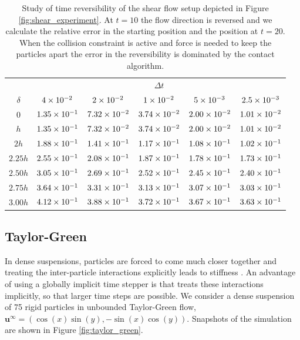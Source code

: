 \documentclass[preprint, 10pt]{elsarticle}
\begin{document}
\begin{table}[!h]
\begin{center}
\begin{tabular}{c| c c c c c}
$ $ & & & $\Delta t$ & &\\
$\delta$ & $4\times 10^{-2}$ &$ 2\times 10^{-2}$ & $1\times 10^{-2}$ & $5\times 10^{-3}$ & $2.5\times 10^{-3}$\\
\hline
0 & $1.35\times 10^{-1}$ & $7.32\times 10^{-2}$ & $3.74\times 10^{-2}$ & $2.00\times 10^{-2}$ & $1.01\times 10^{-2}$\\
$h$ & $1.35\times 10^{-1}$ & $7.32\times 10^{-2}$ & $3.74\times 10^{-2}$ & $2.00\times 10^{-2}$ & $1.01\times 10^{-2}$\\
$2h$ & $1.88\times 10^{-1}$ & $1.41\times 10^{-1}$ & $1.17\times 10^{-1}$ & $1.08\times 10^{-1}$ &
$1.02\times 10^{-1}$\\
$2.25h$ & $2.55\times 10^{-1}$ & $2.08\times 10^{-1}$ & $1.87\times 10^{-1}$ & $1.78\times 10^{-1}$ &
$1.73\times 10^{-1}$\\
$2.50h$ & $3.05\times 10^{-1}$ & $2.69\times 10^{-1}$ & $2.52\times 10^{-1}$ & $2.45\times 10^{-1}$ &
$2.40\times 10^{-1}$\\
$2.75h$ & $3.64\times 10^{-1}$ & $3.31\times 10^{-1}$ & $3.13\times 10^{-1}$ & $3.07\times 10^{-1}$ &
$3.03\times 10^{-1}$\\
$3.00h$ & $4.12\times 10^{-1}$ & $3.88\times 10^{-1}$ & $3.72\times 10^{-1}$ & $3.67\times 10^{-1}$ &
$3.63\times 10^{-1}$
\end{tabular}
\end{center}
\caption{Study of time reversibility of the shear flow setup depicted in Figure
\ref{fig:shear_experiment}. At $t=10$ the flow direction is reversed and we
calculate the relative error in the starting position and the position at
$t=20$. When the collision constraint is active and force is needed to keep the
particles apart the error in the reversibility is dominated by the contact
algorithm.}\label{tab:reverse}
\end{table}

\FloatBarrier
\subsection{Taylor-Green}

In dense suspensions, particles are forced to come much closer together and treating the inter-particle interactions explicitly leads to stiffness \cite{Quaife2014}. An advantage of using a globally implicit time stepper is that treats these interactions implicitly, so that larger time steps are possible. We
consider a dense suspension of 75 rigid particles in unbounded Taylor-Green
flow, $\mathbf{u}^\infty =
(\cos(x)\sin(y), -\sin(x)\cos(y))$. Snapshots of the simulation are shown in
Figure \ref{fig:taylor_green}.
\end{document}
